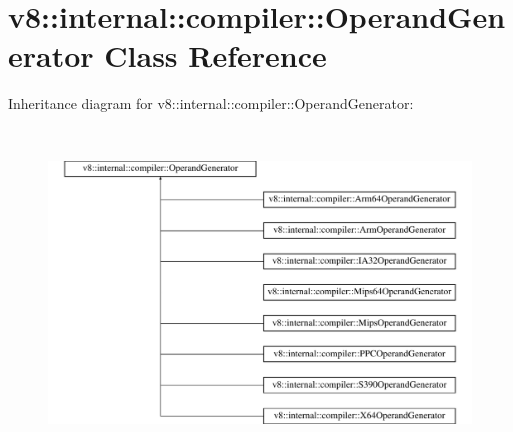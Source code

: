 \hypertarget{classv8_1_1internal_1_1compiler_1_1OperandGenerator}{}\section{v8\+:\+:internal\+:\+:compiler\+:\+:Operand\+Generator Class Reference}
\label{classv8_1_1internal_1_1compiler_1_1OperandGenerator}
Inheritance diagram for v8\+:\+:internal\+:\+:compiler\+:\+:Operand\+Generator\+:\begin{figure}[H]
\begin{center}
\leavevmode
\includegraphics[height=8.689655cm]{classv8_1_1internal_1_1compiler_1_1OperandGenerator}
\end{center}
\end{figure}
